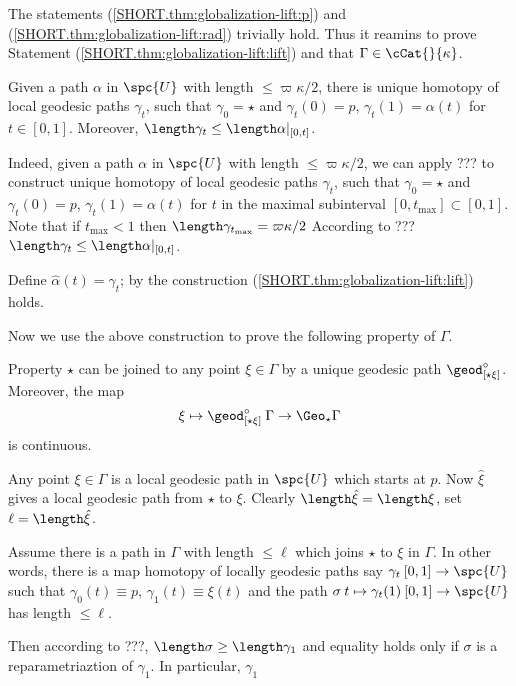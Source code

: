 The statements (\ref{SHORT.thm:globalization-lift:p}) and (\ref{SHORT.thm:globalization-lift:rad}) trivially hold.
Thus it reamins to prove 
Statement (\ref{SHORT.thm:globalization-lift:lift})
and that $\Gamma\in\cCat{}{\kappa}$.

Given a path $\alpha$ in $\spc{U}$ with length $\le\varpi\kappa/2$,
there is unique homotopy of local geodesic paths $\gamma_t$, 
such that $\gamma_0=\star$ and
$\gamma_t(0)=p$, $\gamma_t(1)=\alpha(t)$ for $t\in[0,1]$.
Moreover, $\length\gamma_t\le\length\alpha|_{[0,t]}$.

Indeed, given a path $\alpha$ in $\spc{U}$ with length $\le\varpi\kappa/2$,
we can apply ??? to construct unique homotopy of local geodesic paths $\gamma_t$, such that $\gamma_0=\star$ and
$\gamma_t(0)=p$, $\gamma_t(1)=\alpha(t)$ for $t$ in the maximal subinterval $[0,t_{\max}]\subset [0,1]$.
Note that if $t_{\max}<1$ then $\length\gamma_{t_{\max}}=\varpi\kappa/2$
According to ??? $\length\gamma_t\le\length\alpha|_{[0,t]}$.

Define $\hat\alpha(t)=\gamma_t$; by the construction (\ref{SHORT.thm:globalization-lift:lift}) holds.

\medskip

Now we use the above construction to prove the following property of $\Gamma$.

\begin{clm}{Property}
$\star$ can be joined to any point $\xi\in\Gamma$ by a unique geodesic path $\geod^\circ_{[\star\xi]}$.
Moreover, the map 
$$\xi\mapsto\geod^\circ_{[\star\xi]}\:\Gamma\to\Geo_\star\Gamma$$
is continuous. 
\end{clm}

Any point $\xi\in\Gamma$ is a local geodesic path in $\spc{U}$ which starts at $p$.
Now $\hat\xi$ gives a local geodesic path from $\star$ to $\xi$.
Clearly $\length\hat\xi=\length\xi$,
set $\ell=\length\hat\xi$.

Assume there is a path in $\Gamma$ with length $\le\ell$
which joins $\star$ to $\xi$ in $\Gamma$.
In other words, there is a map homotopy of locally geodesic paths say $\gamma_t\:[0,1]\to\spc{U}$ such that 
$\gamma_0(t)\equiv p$, $\gamma_1(t)\equiv\xi(t)$
and the path $\sigma\:t\mapsto\gamma_t(1)\:[0,1]\to\spc{U}$ 
has length $\le \ell$.

Then according to ???, $\length\sigma\ge\length\gamma_1$ and equality holds only if $\sigma$ is a reparametriaztion of $\gamma_1$.
In particular, $\gamma_1$





